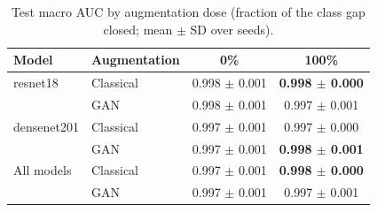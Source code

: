 \begin{table}[htbp]
\centering
\caption{Test macro AUC by augmentation dose (fraction of the class gap closed; mean $\pm$ SD over seeds).}
\label{tab:dose_macro_auc}
\begin{tabular}{llcc}
\toprule
Model & Augmentation & 0\% & 100\% \\
\midrule
resnet18 & Classical & 0.998 $\pm$ 0.001 & \textbf{0.998 $\pm$ 0.000} \\
 & GAN & 0.998 $\pm$ 0.001 & 0.997 $\pm$ 0.001 \\
\addlinespace
densenet201 & Classical & 0.997 $\pm$ 0.001 & 0.997 $\pm$ 0.000 \\
 & GAN & 0.997 $\pm$ 0.001 & \textbf{0.998 $\pm$ 0.001} \\
\addlinespace
All models & Classical & 0.997 $\pm$ 0.001 & \textbf{0.998 $\pm$ 0.000} \\
 & GAN & 0.997 $\pm$ 0.001 & 0.997 $\pm$ 0.001 \\
\bottomrule
\end{tabular}
\end{table}